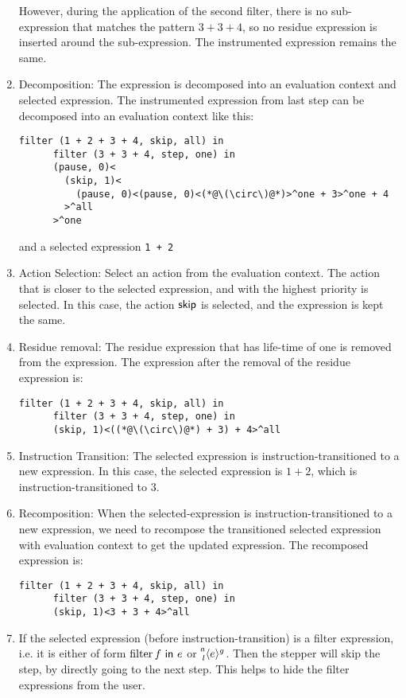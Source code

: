 \begin{enumerate}
    However, during the application of the second filter, there is no sub-expression
    that matches the pattern \(3 + 3 + 4\), so no residue expression is inserted
    around the sub-expression. The instrumented expression remains the same.
  \item Decomposition: The expression is decomposed into an evaluation context
    and selected expression. The instrumented expression from last
    step can be decomposed into an evaluation context like this:
    \begin{lstlisting}[language=hazel]
      filter (1 + 2 + 3 + 4, skip, all) in
      filter (3 + 3 + 4, step, one) in
      (pause, 0)<
        (skip, 1)<
          (pause, 0)<(pause, 0)<(*@\(\circ\)@*)>^one + 3>^one + 4
        >^all
      >^one
    \end{lstlisting}
    and a selected expression \lstinline{1 + 2}
  \item Action Selection:
    Select an action from the evaluation context. The action that is closer
    to the selected expression, and with the highest priority is selected. In
    this case, the action \(\ActSkip\) is selected, and the expression is kept
    the same.
  \item Residue removal: The residue expression that has life-time of one is
    removed from the expression. The expression after the removal of the residue
    expression is:
    \begin{lstlisting}[language=hazel]
      filter (1 + 2 + 3 + 4, skip, all) in
      filter (3 + 3 + 4, step, one) in
      (skip, 1)<((*@\(\circ\)@*) + 3) + 4>^all
    \end{lstlisting}
  \item Instruction Transition: The selected expression is instruction-transitioned
    to a new expression. In this case, the selected expression is \(1 + 2\),
    which is instruction-transitioned to \(3\).

  \item Recomposition: When the selected-expression is instruction-transitioned
    to a new expression, we need to recompose the transitioned selected
    expression with evaluation context to get the updated expression. The
    recomposed expression is:
    \begin{lstlisting}[language=hazel]
      filter (1 + 2 + 3 + 4, skip, all) in
      filter (3 + 3 + 4, step, one) in
      (skip, 1)<3 + 3 + 4>^all
    \end{lstlisting}

  \item If the selected expression (before instruction-transition) is a filter
    expression, i.e. it is either of form \(\Filter{f}{e}\) or
    \(\Residue{a}{g}{l}{e}\). Then the stepper will skip the step, by directly
    going to the next step. This helps to hide the filter expressions from the
    user.


\end{enumerate}
